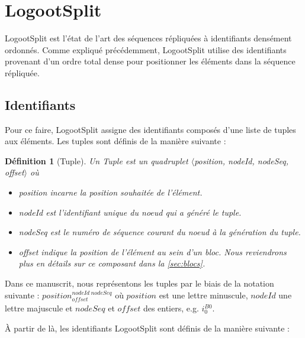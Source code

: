 \documentclass[12pt]{thesul}
\newtheorem{definition}{Définition}
\newcommand{\eg}{e.g. }
\newcommand{\trm}[1]{\mathit{#1}}
\newcommand{\id}[3]{$\trm{#1}^{\trm{#2}}_{\trm{#3}}$}
\begin{document}


\section{LogootSplit}

LogootSplit \cite{2013-logootsplit} est l'état de l'art des séquences répliquées à identifiants densément ordonnés.
Comme expliqué précédemment, LogootSplit utilise des identifiants provenant d'un ordre total dense pour positionner les éléments dans la séquence répliquée.

\subsection{Identifiants}

Pour ce faire, LogootSplit assigne des identifiants composés d'une liste de tuples aux éléments.
Les tuples sont définis de la manière suivante :

\begin{definition}[Tuple]
  Un \emph{Tuple} est un quadruplet $\langle$position, nodeId, nodeSeq, offset$\rangle$ où
  \begin{itemize}
    \item position incarne la position souhaitée de l'élément.
    \item nodeId est l'identifiant unique du noeud qui a généré le tuple.
    \item nodeSeq est le numéro de séquence courant du noeud à la génération du tuple.
    \item offset indique la position de l'élément au sein d'un bloc. Nous reviendrons plus en détails sur ce composant dans la \autoref{sec:blocs}.
  \end{itemize}
\end{definition}


Dans ce manuscrit, nous représentons les tuples par le biais de la notation suivante : \id{position}{nodeId~nodeSeq}{offset} où $\trm{position}$ est une lettre minuscule, $\trm{nodeId}$ une lettre majuscule et $\trm{nodeSeq}$ et $\trm{offset}$ des entiers, \eg \id{i}{B0}{0}.

À partir de là, les identifiants LogootSplit sont définis de la manière suivante :
\end{document}
